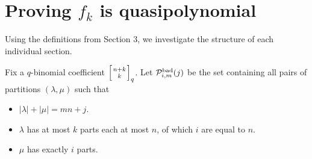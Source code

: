 \documentclass[12pt]{article}
\newcommand{\qbinom}[2]{\left[{#1 \atop #2}\right]_q}
\begin{document}
\section[Proving the main theorem]{Proving $f_{k}$ is quasipolynomial}

Using the definitions from Section 3, we investigate the structure of each individual section.

\begin{definition} Fix a $q$-binomial coefficient $\qbinom{n+k}{k}$. Let $\mathcal{P}_{i,m}^{\textup{bad}}(j)$ be the set containing all pairs of partitions $(\lambda, \mu)$ such that
\begin{itemize}
\item $|\lambda|+|\mu|=mn+j$.
\item $\lambda$ has at most $k$ parts each at most $n$, of which $i$ are equal to $n$.
\item $\mu$ has exactly $i$ parts.
\end{itemize}
\label{pbad}
\end{definition}
\end{document}
